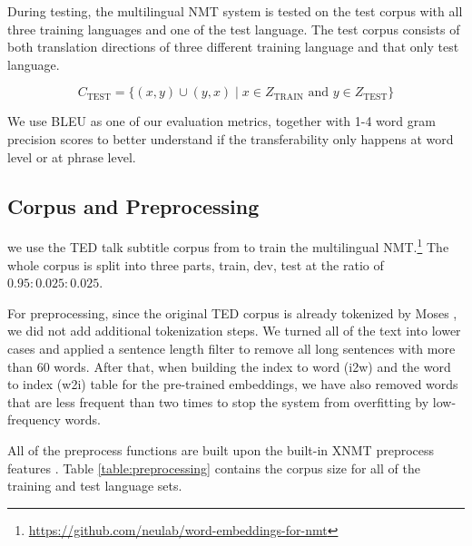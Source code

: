 \documentclass[thesis,fonts=libertine]{cluu}
\begin{document}
During testing, the multilingual NMT system is tested on the test corpus with all three training languages and one of the test language. The test corpus consists of both translation directions of three different training language and that only test language.

\begin{equation*}
  C_{\text{TEST}} = \{(x, y)\cup(y,x) \mid x \in Z_{\text{TRAIN}} \text{ and } y \in Z_{\text{TEST}}\}
\end{equation*}

We use BLEU \parencite{papineni-etal-2002-bleu} as one of our evaluation metrics, together with 1-4 word gram precision scores to better understand if the transferability only happens at word level or at phrase level.

\subsection{Corpus and Preprocessing}

we use the TED talk subtitle corpus from \textcite{Qi:2018aa} to train the multilingual NMT.\footnote{\url{https://github.com/neulab/word-embeddings-for-nmt}} The whole corpus is split into three parts, train, dev, test at the ratio of $0.95:0.025:0.025$.

For preprocessing, since the original TED corpus is already tokenized by Moses \parencite{koehn-etal-2007-moses}, we did not add additional tokenization steps. We turned all of the text into lower cases and applied a sentence length filter to remove all long sentences with more than 60 words. After that, when building the index to word (i2w) and the word to index (w2i) table for the pre-trained embeddings, we have also removed words that are less frequent than two times to stop the system from overfitting by low-frequency words.

All of the preprocess functions are built upon the built-in XNMT preprocess features \parencite{Neubig:2018aa}. Table \ref{table:preprocessing} contains the corpus size for all of the training and test language sets.
\end{document}
